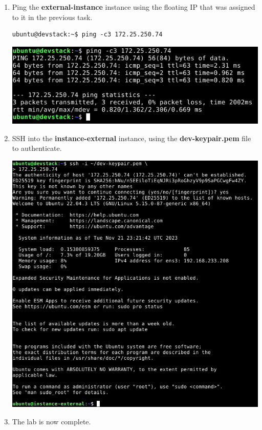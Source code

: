 \documentclass[letterpaper, 12pt]{article}
\begin{document}
\begin{enumerate}
    \item Ping the \textbf{external-instance} instance using the floating IP that was assigned to it in the previous
    task.
\begin{lstlisting}
ubuntu@devstack:~$ ping -c3 172.25.250.74
\end{lstlisting}

    \begin{center}
        \includegraphics[width=\linewidth]{images/part6/step4.png}
    \end{center}

    \item SSH into the \textbf{instance-external} instance, using the \textbf{dev-keypair.pem} file to authenticate.

    \begin{center}
        \includegraphics[width=\linewidth]{images/part6/step5.png}
    \end{center}

    \item The lab is now complete.

\end{enumerate}
\end{document}
